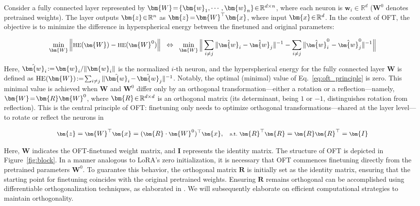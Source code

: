Consider a fully connected layer represented by $\thickmuskip=2mu \medmuskip=2mu \bm{W}=\{\bm{w}_1,\cdots,\bm{w}_n\}\in\mathbb{R}^{d\times n}$, where each neuron is $\bm{w}_i\in\mathbb{R}^{d}$ ($\bm{W}^0$ denotes pretrained weights). The layer outputs $\thickmuskip=2mu \medmuskip=2mu \bm{z}\in\mathbb{R}^n$ as $\thickmuskip=2mu \medmuskip=2mu \bm{z}=\bm{W}^\top\bm{x}$, where input $\thickmuskip=2mu \medmuskip=2mu \bm{x}\in\mathbb{R}^d$. In the context of OFT, the objective is to minimize the difference in hyperspherical energy between the finetuned and original parameters:

\begin{equation}\label{eq:oft_principle}
\footnotesize
\min_{\bm{W}} \left\| \text{HE}(\bm{W})-\text{HE}(\bm{W}^0)\right\|~~\Leftrightarrow~~\min_{\bm{W}} \bigg{\|} \sum_{i\neq j} \|\hat{\bm{w}}_i-\hat{\bm{w}}_j\|^{-1}-\sum_{i\neq j} \|\hat{\bm{w}}^0_i-\hat{\bm{w}}^0_j\|^{-1}\bigg{\|}
\end{equation}

Here, $\thickmuskip=2mu \medmuskip=2mu \hat{\bm{w}}_i:=\bm{w}_i/\|\bm{w}_i\|$ is the normalized $i$-th neuron, and the hyperspherical energy for the fully connected layer $\bm{W}$ is defined as $\thickmuskip=2mu \medmuskip=2mu \text{HE}(\bm{W}):= \sum_{i\neq j} \|\hat{\bm{w}}_i-\hat{\bm{w}}_j\|^{-1}$. Notably, the optimal (minimal) value of Eq.~\eqref{eq:oft_principle} is zero. This minimal value is achieved when $\bm{W}$ and $\bm{W}^0$ differ only by an orthogonal transformation—either a rotation or a reflection—namely, $\thickmuskip=2mu \medmuskip=2mu \bm{W}=\bm{R}\bm{W}^0$, where $\thickmuskip=2mu \medmuskip=2mu \bm{R}\in\mathbb{R}^{d\times d}$ is an orthogonal matrix (its determinant, being $1$ or $-1$, distinguishes rotation from reflection). This is the central principle of OFT: finetuning only needs to optimize orthogonal transformations—shared at the layer level—to rotate or reflect the neurons in

\begin{equation}\label{eq:oft_general}
    \footnotesize
    \bm{z}=\bm{W}^\top\bm{x}=(\bm{R}\cdot\bm{W}^0)^\top\bm{x},~~~\text{s.t.}~\bm{R}^\top\bm{R}=\bm{R}\bm{R}^\top=\bm{I}
\end{equation}

Here, $\bm{W}$ indicates the OFT-finetuned weight matrix, and $\bm{I}$ represents the identity matrix. The structure of OFT is depicted in Figure~\ref{fig:block}. In a manner analogous to LoRA's zero initialization, it is necessary that OFT commences finetuning directly from the pretrained parameters $\bm{W}^0$. To guarantee this behavior, the orthogonal matrix $\bm{R}$ is initially set as the identity matrix, ensuring that the starting point for finetuning coincides with the original pretrained weights. Ensuring $\bm{R}$ remains orthogonal can be accomplished using differentiable orthogonalization techniques, as elaborated in \cite{liu2021orthogonal,lezcano2019cheap}. We will subsequently elaborate on efficient computational strategies to maintain orthogonality.

